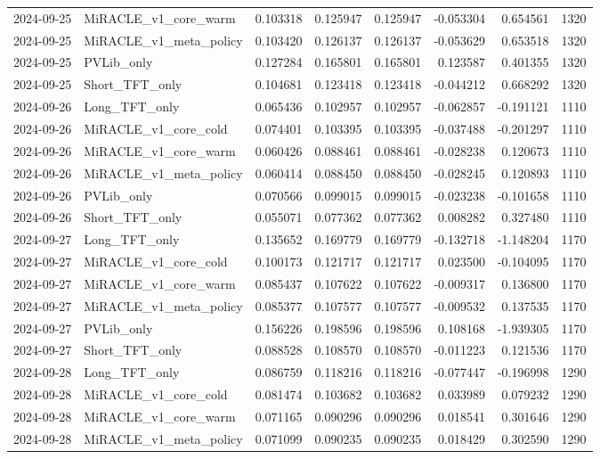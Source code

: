 \begin{tabular}{llrrrrrr}
2024-09-25 & MiRACLE_v1_core_warm & 0.103318 & 0.125947 & 0.125947 & -0.053304 & 0.654561 & 1320 \\
2024-09-25 & MiRACLE_v1_meta_policy & 0.103420 & 0.126137 & 0.126137 & -0.053629 & 0.653518 & 1320 \\
2024-09-25 & PVLib_only & 0.127284 & 0.165801 & 0.165801 & 0.123587 & 0.401355 & 1320 \\
2024-09-25 & Short_TFT_only & 0.104681 & 0.123418 & 0.123418 & -0.044212 & 0.668292 & 1320 \\
2024-09-26 & Long_TFT_only & 0.065436 & 0.102957 & 0.102957 & -0.062857 & -0.191121 & 1110 \\
2024-09-26 & MiRACLE_v1_core_cold & 0.074401 & 0.103395 & 0.103395 & -0.037488 & -0.201297 & 1110 \\
2024-09-26 & MiRACLE_v1_core_warm & 0.060426 & 0.088461 & 0.088461 & -0.028238 & 0.120673 & 1110 \\
2024-09-26 & MiRACLE_v1_meta_policy & 0.060414 & 0.088450 & 0.088450 & -0.028245 & 0.120893 & 1110 \\
2024-09-26 & PVLib_only & 0.070566 & 0.099015 & 0.099015 & -0.023238 & -0.101658 & 1110 \\
2024-09-26 & Short_TFT_only & 0.055071 & 0.077362 & 0.077362 & 0.008282 & 0.327480 & 1110 \\
2024-09-27 & Long_TFT_only & 0.135652 & 0.169779 & 0.169779 & -0.132718 & -1.148204 & 1170 \\
2024-09-27 & MiRACLE_v1_core_cold & 0.100173 & 0.121717 & 0.121717 & 0.023500 & -0.104095 & 1170 \\
2024-09-27 & MiRACLE_v1_core_warm & 0.085437 & 0.107622 & 0.107622 & -0.009317 & 0.136800 & 1170 \\
2024-09-27 & MiRACLE_v1_meta_policy & 0.085377 & 0.107577 & 0.107577 & -0.009532 & 0.137535 & 1170 \\
2024-09-27 & PVLib_only & 0.156226 & 0.198596 & 0.198596 & 0.108168 & -1.939305 & 1170 \\
2024-09-27 & Short_TFT_only & 0.088528 & 0.108570 & 0.108570 & -0.011223 & 0.121536 & 1170 \\
2024-09-28 & Long_TFT_only & 0.086759 & 0.118216 & 0.118216 & -0.077447 & -0.196998 & 1290 \\
2024-09-28 & MiRACLE_v1_core_cold & 0.081474 & 0.103682 & 0.103682 & 0.033989 & 0.079232 & 1290 \\
2024-09-28 & MiRACLE_v1_core_warm & 0.071165 & 0.090296 & 0.090296 & 0.018541 & 0.301646 & 1290 \\
2024-09-28 & MiRACLE_v1_meta_policy & 0.071099 & 0.090235 & 0.090235 & 0.018429 & 0.302590 & 1290 \\

\end{tabular}
